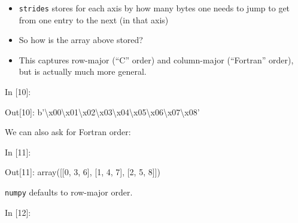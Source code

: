     \begin{itemize}
\tightlist
\item
  \texttt{strides} stores for each axis by how many bytes one needs to
  jump to get from one entry to the next (in that axis)
\item
  So how is the array above stored?
\item
  This captures row-major (``C'' order) and column-major (``Fortran''
  order), but is actually much more general.
\end{itemize}

    \begin{BGVerbatim}[commandchars=\\\{\}]
{\color{incolor}In [{\color{incolor}10}]:} 
\end{BGVerbatim}

\begin{BGVerbatim}[commandchars=\\\{\}]
{\color{outcolor}Out[{\color{outcolor}10}]:} b'\textbackslash{}x00\textbackslash{}x01\textbackslash{}x02\textbackslash{}x03\textbackslash{}x04\textbackslash{}x05\textbackslash{}x06\textbackslash{}x07\textbackslash{}x08'
\end{BGVerbatim}
            
    We can also ask for Fortran order:

    \begin{BGVerbatim}[commandchars=\\\{\}]
{\color{incolor}In [{\color{incolor}11}]:}     
\end{BGVerbatim}

\begin{BGVerbatim}[commandchars=\\\{\}]
{\color{outcolor}Out[{\color{outcolor}11}]:} array([[0, 3, 6],
                [1, 4, 7],
                [2, 5, 8]])
\end{BGVerbatim}
            
    \texttt{numpy} defaults to row-major order.

    \begin{BGVerbatim}[commandchars=\\\{\}]
{\color{incolor}In [{\color{incolor}12}]:} 
\end{BGVerbatim}

